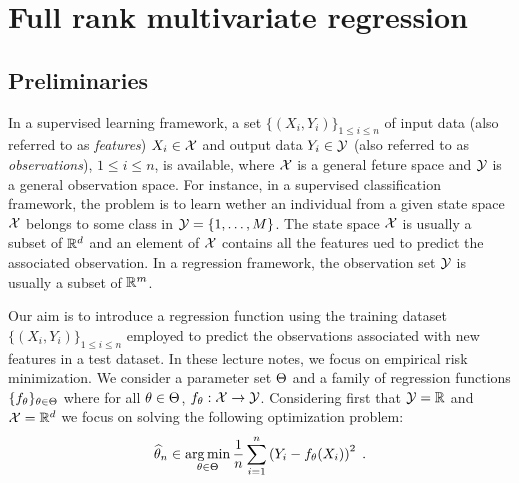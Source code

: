 
\section{Full rank multivariate regression}
\label{sec:full:rank:reg}

\subsection{Preliminaries}
In a supervised learning framework, a set $\{(X_i,Y_i)\}_{1\leqslant i \leqslant n}$  of input data (also referred to as {\em features}) $X_i\in\mathcal{X}$ and output data $Y_i\in\mathcal{Y}$ (also referred to as {\em observations}), $1\leqslant i \leqslant n$, is available, where $\mathcal{X}$ is a general feture space and $\mathcal{Y}$ is a general observation space. For instance, in a supervised classification framework, the problem is to learn wether an individual from a given state space $\mathcal{X}$ belongs to some class in $\mathcal{Y} = \{1,\ldots,M\}$. The state space $\mathcal{X}$ is usually a subset of $\mathbb{R}^d$ and an element of $\mathcal{X}$ contains all the features ued to predict the associated observation. In a regression framework, the observation set $\mathcal{Y}$ is usually a subset of $\mathbb{R}^m$.


Our aim is to introduce a regression function using the training dataset $\{(X_i,Y_i)\}_{1\leqslant i \leqslant n}$ employed to predict the observations associated with new features in a test dataset. In these lecture notes, we focus on empirical risk minimization. We consider a parameter set $\Theta$ and a family of regression functions $\{f_\theta\}_{\theta\in\Theta}$ where for all $\theta\in\Theta$, $f_\theta: \mathcal{X}\to \mathcal{Y}$. Considering first that $\mathcal{Y} = \mathbb{R}$ and  $\mathcal{X} = \mathbb{R}^d$  we focus on solving the following optimization problem:
$$
\widehat \param_n\in  \argmin_{\param\in\paramset}  \frac{1}{n}\sum_{i=1}^n\left(Y_i-f_\param(X_i)\right)^2\eqsp.
$$


